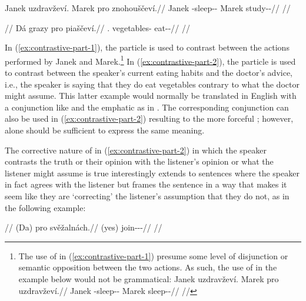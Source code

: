 \pex\label{ex:contrastive-part-1}
\begingl
	\gla Janek uzdravževí. Marek pro znohouščeví.//
	\glb Janek \Refl{}-sleep-\Av{}-\Cont{} Marek \Cntr{} study-\Av{}-\Cont{}//
	\glft {}//
\endgl
\xe

\pex\label{ex:contrastive-part-2}
\begingl
	\glpreamble {}//
	\gla Dá grazy pro piaščeví.//
	\glb \First.\Sg{} vegetables-\Gen{} \Cntr{} eat-\Av{}-\Cont{}//
	\glft {}//
\endgl
\xe

In (\ref{ex:contrastive-part-1}), the particle  is used to contrast
between the actions performed by Janek and Marek.\footnote{The use of 
in (\ref{ex:contrastive-part-1}) presume some level of disjunction or semantic
opposition between the two actions. As such, the use of  in the example
below would not be grammatical:
\ex[lingstyle=fnex,belowexskip=-1em,aboveglftskip=1pt]
\begingl
	\gla \ljudge{*}Janek uzdravževí. Marek pro uzdravževí.//
	\glb Janek \Refl{}-sleep-\Av{}-\Cont{} Marek \Cntr{} sleep-\Av{}-\Cont{}//
	\glft {}//
\endgl
\xe
} In (\ref{ex:contrastive-part-2}), the particle  is used to contrast
between the speaker's current eating habits and the doctor's advice, i.e., the
speaker is saying that they do eat vegetables contrary to what the doctor might
assume. This latter example would normally be translated in English with a
conjunction like  and the emphatic  as in . The corresponding conjunction  can also be used in
(\ref{ex:contrastive-part-2}) resulting to the more forceful ; however,  alone should be
sufficient to express the same meaning.

The corrective nature of  in (\ref{ex:contrastive-part-2}) in which the
speaker contrasts the truth or their opinion with the listener's opinion or what
the listener might assume is true interestingly extends to sentences where the
speaker in fact agrees with the listener but frames the sentence in a way that
makes it seem like they are `correcting' the listener's assumption that they do
not, as in the following example:

\pex
\begingl
	\glpreamble {}//
	\gla (Da) pro svěžalnách.//
	\glb (yes) \Cntr{} join-\Av{}-\Pot{}-\Ctp{}//
	\glft {}//
\endgl
\xe

